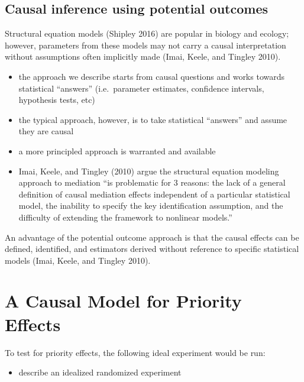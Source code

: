 \documentclass[]{article}
\providecommand{\tightlist}{%
  \setlength{\itemsep}{0pt}\setlength{\parskip}{0pt}}
\begin{document}
\hypertarget{causal-inference-using-potential-outcomes}{%
\subsection{Causal inference using potential
outcomes}\label{causal-inference-using-potential-outcomes}}

Structural equation models (Shipley 2016) are popular in biology and
ecology; however, parameters from these models may not carry a causal
interpretation without assumptions often implicitly made (Imai, Keele,
and Tingley 2010).

\begin{itemize}
\tightlist
\item
  the approach we describe starts from causal questions and works
  towards statistical ``answers'' (i.e.~parameter estimates, confidence
  intervals, hypothesis tests, etc)
\item
  the typical approach, however, is to take statistical ``answers'' and
  assume they are causal
\item
  a more principled approach is warranted and available
\item
  Imai, Keele, and Tingley (2010) argue the structural equation modeling
  approach to mediation ``is problematic for 3 reasons: the lack of a
  general definition of causal mediation effects independent of a
  particular statistical model, the inability to specify the key
  identification assumption, and the difficulty of extending the
  framework to nonlinear models.''
\end{itemize}

An advantage of the potential outcome approach is that the causal
effects can be defined, identified, and estimators derived without
reference to specific statistical models (Imai, Keele, and Tingley
2010).

\hypertarget{a-causal-model-for-priority-effects}{%
\section{A Causal Model for Priority
Effects}\label{a-causal-model-for-priority-effects}}

To test for priority effects, the following ideal experiment would be
run:

\begin{itemize}
\tightlist
\item
  describe an idealized randomized experiment
\end{itemize}
\end{document}
